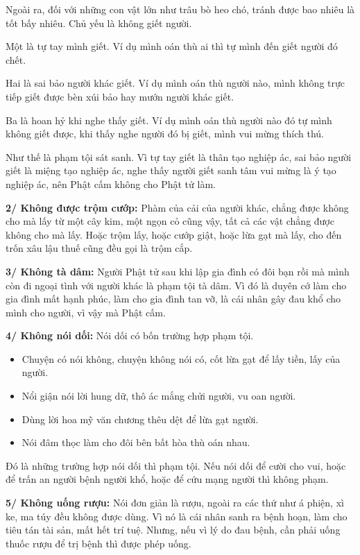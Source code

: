 \documentclass[
  12pt,
  oneside]{book}
\providecommand{\tightlist}{%
  \setlength{\itemsep}{0pt}\setlength{\parskip}{0pt}}
\begin{document}
Ngoài ra, đối với những con vật lớn như trâu bò heo chó, tránh được bao nhiêu là tốt bấy nhiêu. Chủ yếu là không giết người.

Một là tự tay mình giết. Ví dụ mình oán thù ai thì tự mình đến giết người đó chết.

Hai là sai bảo người khác giết. Ví dụ mình oán thù người nào, mình không trực tiếp giết được bèn xúi bảo hay mướn người khác giết.

Ba là hoan hỷ khi nghe thấy giết. Ví dụ mình oán thù người nào đó tự mình không giết được, khi thấy nghe người đó bị giết, mình vui mừng thích thú.

Như thế là phạm tội sát sanh. Vì tự tay giết là thân tạo nghiệp ác, sai bảo người giết là miệng tạo nghiệp ác, nghe thấy người giết sanh tâm vui mừng là ý tạo nghiệp ác, nên Phật cấm không cho Phật tử làm.

\textbf{2/ Không được trộm cướp:} Phàm của cải của người khác, chẳng được không cho mà lấy từ một cây kim, một ngọn cỏ cũng vậy, tất cả các vật chẳng được không cho mà lấy. Hoặc trộm lấy, hoặc cướp giật, hoặc lừa gạt mà lấy, cho đến trốn xâu lậu thuế cũng đều gọi là trộm cắp.

\textbf{3/ Không tà dâm:} Người Phật tử sau khi lập gia đình có đôi bạn rồi mà mình còn đi ngoại tình với người khác là phạm tội tà dâm. Vì đó là duyên cớ làm cho gia đình mất hạnh phúc, làm cho gia đình tan vỡ, là cái nhân gây đau khổ cho mình cho người, vì vậy mà Phật cấm.

\textbf{4/ Không nói dối:} Nói dối có bốn trường hợp phạm tội.

\begin{itemize}
\tightlist
\item
  Chuyện có nói không, chuyện không nói có, cốt lừa gạt để lấy tiền, lấy của người.\\
\item
  Nổi giận nói lời hung dữ, thô ác mắng chửi người, vu oan người.\\
\item
  Dùng lời hoa mỹ văn chương thêu dệt để lừa gạt người.\\
\item
  Nói đâm thọc làm cho đôi bên bất hòa thù oán nhau.
\end{itemize}

Đó là những trường hợp nói dối thì phạm tội. Nếu nói dối để cười cho vui, hoặc để trấn an người bệnh người khổ, hoặc để cứu mạng người thì không phạm.

\textbf{5/ Không uống rượu:} Nói đơn giản là rượu, ngoài ra các thứ như á phiện, xì ke, ma túy đều không được dùng. Vì nó là cái nhân sanh ra bệnh hoạn, làm cho tiêu tán tài sản, mất hết trí tuệ. Nhưng, nếu vì lý do đau bệnh, cần phải uống thuốc rượu để trị bệnh thì được phép uống.
\end{document}
